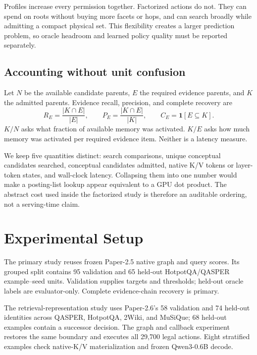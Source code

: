 \documentclass[11pt]{article}
\begin{document}
Profiles increase every permission together. Factorized actions do not. They can spend on roots
without buying more facets or hops, and can search broadly while admitting a compact physical set.
This flexibility creates a larger prediction problem, so oracle headroom and learned policy quality
must be reported separately.

\subsection{Accounting without unit confusion}

Let $N$ be the available candidate parents, $E$ the required evidence parents, and $K$ the admitted
parents. Evidence recall, precision, and complete recovery are
\begin{equation}
R_E=\frac{|K\cap E|}{|E|},\qquad
P_E=\frac{|K\cap E|}{|K|},\qquad
C_E=\mathbf 1[E\subseteq K].
\label{eq:evidence-metrics}
\end{equation}
$K/N$ asks what fraction of available memory was activated. $K/E$ asks how much memory was
activated per required evidence item. Neither is a latency measure.

We keep five quantities distinct: search comparisons, unique conceptual candidates searched,
conceptual candidates admitted, native K/V tokens or layer-token states, and wall-clock latency.
Collapsing them into one number would make a posting-list lookup appear equivalent to a GPU dot
product. The abstract cost used inside the factorized study is therefore an auditable ordering, not
a serving-time claim.

\section{Experimental Setup}

The primary study reuses frozen Paper-2.5 native graph and query scores. Its grouped split contains
95 validation and 65 held-out HotpotQA/QASPER example--seed units. Validation supplies targets and
thresholds; held-out oracle labels are evaluator-only. Complete evidence-chain recovery is primary.

The retrieval-representation study uses Paper-2.6's 58 validation and 74 held-out identities across
QASPER, HotpotQA, 2Wiki, and MuSiQue; 68 held-out examples contain a successor decision. The graph
and callback experiment restores the same boundary and executes all 29,700 legal actions. Eight
stratified examples check native-K/V materialization and frozen Qwen3-0.6B decode.
\end{document}
